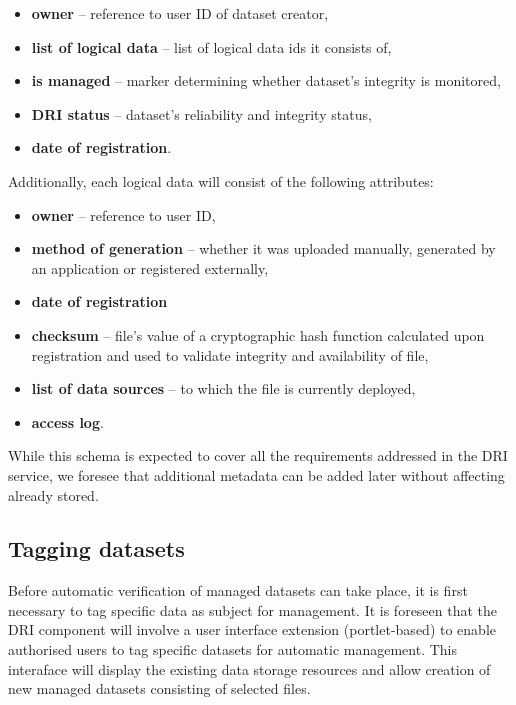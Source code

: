 \begin{itemize}
	\item \textbf{owner} -- reference to user ID of dataset creator,
	\item \textbf{list of logical data} -- list of logical data ids it consists of,
	\item \textbf{is managed} -- marker determining whether dataset's integrity
	is monitored,
	\item \textbf{DRI status} -- dataset's reliability and integrity status,
	\item \textbf{date of registration}.
\end{itemize}

\noindent
Additionally, each logical data will consist of the following attributes:

\begin{itemize}
	\item \textbf{owner} -- reference to user ID,
	\item \textbf{method of generation} -- whether it was uploaded manually, 
	generated by an application or registered externally,
	\item \textbf{date of registration}
	\item \textbf{checksum} -- file's value of a cryptographic hash function
	calculated upon registration and used to validate integrity and 
	availability of file,
	\item \textbf{list of data sources} -- to which the file is currently
	deployed,
	\item \textbf{access log}.
\end{itemize}

While this schema is expected to cover all the requirements addressed in the
DRI service, we foresee that additional metadata can be added later without
affecting already stored.

		\subsection{Tagging datasets}
Before automatic verification of managed datasets can take place, it is first
necessary to tag specific data as subject for management. It is foreseen that
the DRI component will involve a user interface extension (portlet-based) to
enable authorised users to tag specific datasets for automatic management. This
interaface will display the existing data storage resources and allow creation
of new managed datasets consisting of selected files.\\

